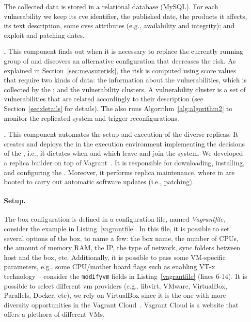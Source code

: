 The collected data is stored in a relational database (MySQL).
For each vulnerability we keep its \gls{cve} identifier, the published date, the products it affects, its text description, some \gls{cvss} attributes (e.g., availability and integrity); and exploit and patching dates.


 \textbf{\risk.} This component finds out when it is necessary to replace the currently running group of \replicas and discovers an alternative configuration that decreases the risk. 
As explained in Section~\ref{sec:measurerisk}, the risk is computed using score values that require two kinds of data: the information about the vulnerabilities, which is collected by the \fetcher; and the vulnerability clusters. 
A vulnerability cluster is a set of vulnerabilities that are related accordingly to their description (see Section~\ref{sec:details} for details).
The \risk also runs Algorithm~\ref{alg:algorithm2} to monitor the replicated system and trigger reconfigurations.


 \textbf{\manager.} 
This component automates the setup and execution of the diverse replicas. 
It creates and deploys the \replicas in the execution environment implementing the decisions of the \risk, i.e., it dictates when and which \replicas leave and join the system. 
We developed a replica builder on top of Vagrant~\cite{vagrant}.
It is responsible for downloading, installing, and configuring the \replicas.
Moreover, it performs replica maintenance, where  \replicas in \QS are booted to carry out automatic software updates (i.e., patching). 


\paragraph{Setup.}
The box configuration is defined in a configuration file, named \emph{Vagrantfile}, consider the example in Listing~\ref{vagrantfile}.
In this file, it is possible to set several options of the box, to name a few:
the box name, the number of CPUs, the amount of memory RAM, the IP, the type of network, sync folders between host and the box, etc. 
Additionally, it is possible to pass some VM-specific parameters, e.g., some CPU/mother board flags such as enabling VT-x technology -- consider the \texttt{modifyvm} fields in Listing~\ref{vagrantfile} (lines 6-14).
It is possible to select different \gls{vm} providers (e.g., libvirt, VMware, VirtualBox, Parallels, Docker, etc), we rely on VirtualBox since it is the one with more diversity opportunities in the Vagrant Cloud~\cite{vagrantcloud}. 
Vagrant Cloud is a website that offers a plethora of different VMs.

